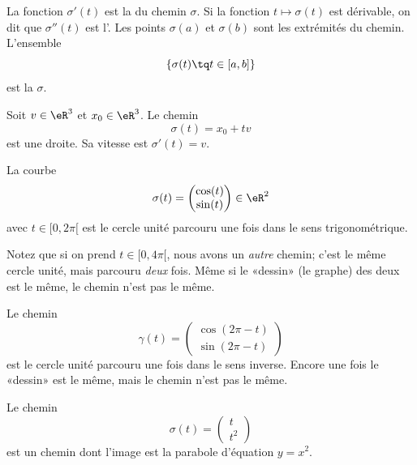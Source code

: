 La fonction $\sigma'(t)$ est la  du chemin $\sigma$. Si la fonction $t\mapsto\sigma(t)$ est dérivable, on dit que $\sigma''(t)$ est l'. Les points $\sigma(a)$ et $\sigma(b)$ sont les extrémités du chemin. L'ensemble
\begin{equation}
    \{ \sigma(t)\tq t\in\mathopen[ a , b \mathclose] \}
\end{equation}
est la  $\sigma$.

\begin{example}
    Soit $v\in\eR^3$ et $x_0\in\eR^3$. Le chemin
    \begin{equation}
        \sigma(t)=x_0+tv
    \end{equation}
    est une droite. Sa vitesse est $\sigma'(t)=v$.    
\end{example}

\begin{example}
    La courbe
    \begin{equation}
        \sigma(t)=\begin{pmatrix}
            \cos(t)    \\ 
            \sin(t)    
        \end{pmatrix}\in\eR^2
    \end{equation}
    avec $t\in\mathopen[ 0 , 2\pi [$ est le cercle unité parcouru une fois dans le sens trigonométrique.

    Notez que si on prend $t\in\mathopen[ 0 , 4\pi [$, nous avons un \emph{autre} chemin; c'est le même cercle unité, mais parcouru \emph{deux} fois. Même si le «dessin» (le graphe) des deux est le même, le chemin n'est pas le même.

    Le chemin
    \begin{equation}
        \gamma(t)=\begin{pmatrix}
            \cos(2\pi-t)    \\ 
            \sin(2\pi-t)    
        \end{pmatrix}
    \end{equation}
    est le cercle unité parcouru une fois dans le sens inverse. Encore une fois le «dessin» est le même, mais le chemin n'est pas le même.
\end{example}

\begin{example}
    Le chemin
    \begin{equation}
        \sigma(t)=\begin{pmatrix}
            t    \\ 
            t^2    
        \end{pmatrix}
    \end{equation}
    est un chemin dont l'image est la parabole d'équation $y=x^2$.
\end{example}

